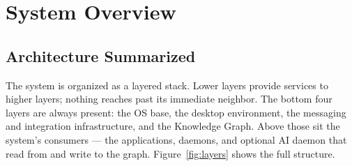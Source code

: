 \section{System Overview}
\label{sec:overview}

\subsection{Architecture Summarized}
\label{sec:arch-glance}

The system is organized as a layered stack. Lower layers provide services to
higher layers; nothing reaches past its immediate neighbor. The bottom four
layers are always present: the OS base, the desktop environment, the messaging
and integration infrastructure, and the Knowledge Graph. Above those sit the
system's consumers --- the applications, daemons, and optional AI daemon that
read from and write to the graph. Figure~\ref{fig:layers} shows the full
structure.


